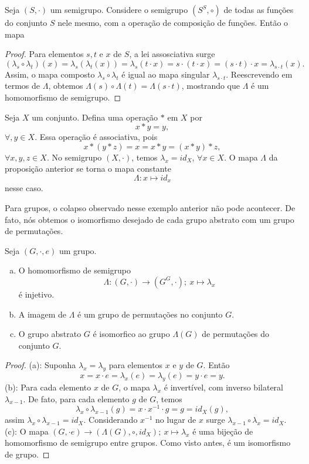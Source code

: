    \begin{stat}
      Seja $(S,\cdot)$ um semigrupo. Considere o semigrupo $(S^{S}, \circ)$ de todas as funções do conjunto $S$ nele mesmo, com a operação de composição de funções. Então o mapa
      \begin{proof}
         Para elementos $s,t$ e $x$ de $S$, a lei assosciativa surge $$(\lambda_{s} \circ \lambda_{t})(x) = \lambda_{s}(\lambda_{t}(x)) = \lambda_{s}(t\cdot x) = s \cdot (t \cdot x) = (s \cdot t) \cdot x = \lambda_{s\cdot t } (x).$$
         Assim, o mapa composto $\lambda_{s} \circ \lambda_{t}$ é igual ao mapa singular $\lambda_{s\cdot t}$. Reescrevendo em termos de $\Lambda$, obtemos $\Lambda(s) \circ \Lambda (t) = \Lambda(s\cdot t)$, mostrando que $\Lambda$ é um homomorfismo de semigrupo.
      \end{proof}
   \end{stat}
   \begin{exmp}
      Seja $X$ um conjunto. Defina uma operação $*$ em $X$ por $$x * y = y,$$ $\forall, y \in X$. Essa operação é associativa, pois $$x * (y * z) = x = x * y = (x * y) * z,$$ $\forall x, y , z \in X$. No semigrupo $(X, \cdot)$, temos $\lambda_{x} = id_{X}$, $\forall x \in X$. O mapa $\Lambda$ da proposição anterior se torna o mapa constante $$\Lambda: x \mapsto id_{x}$$ nesse caso.
   \end{exmp}
   Para grupos, o colapso observado nesse exemplo anterior não pode acontecer. De fato, nós obtemos o isomorfismo desejado de cada grupo abstrato com um grupo de permutações.

   \begin{theorem}
      Seja $(G, \cdot , e)$ um grupo.
      \begin{enumerate}[(a)]
         \item O homomorfismo de semigrupo $$\Lambda: (G, \cdot) \to (G^{G}, \cdot);\ x\mapsto \lambda_{x}$$ é injetivo.
         \item A imagem de $\Lambda$ é um grupo de permutações no conjunto $G$.
         \item O grupo abstrato $G$ é isomorfico ao grupo $\Lambda(G)$ de permutações do conjunto $G$.
      \end{enumerate}
      \begin{proof}
         (a): Suponha $\lambda_{x} = \lambda_{y}$ para elementos $x$ e $y$ de $G$. Então 
         $$x = x \cdot e = \lambda_{x}(e) = \lambda_{y}(e) = y \cdot e = y.$$ (b): Para cada elemento $x$ de $G$, o mapa $\lambda_{x}$ é invertível, com inverso bilateral $\lambda_{x-1}.$ De fato, para cada elemento $g$ de $G$, temos 
         $$\lambda_{x}\circ \lambda_{x-1}(g) = x \cdot x^{-1} \cdot g = g = id_{X}(g),$$ assim $\lambda_{x}\circ \lambda_{x-1} = id_{X}$. Considerando $x^{-1}$ no lugar de $x$ surge $\lambda_{x-1} \circ \lambda_{x} = id_{X}.$
         (c): O mapa $(G,\cdot e) \to (\Lambda(G), \circ, id_{X});\ x \mapsto \lambda_{x}$ é uma bijeção de homomorfismo de semigrupo entre grupos. Como visto antes, é um isomorfismo de grupo.
      \end{proof}
   \end{theorem}

